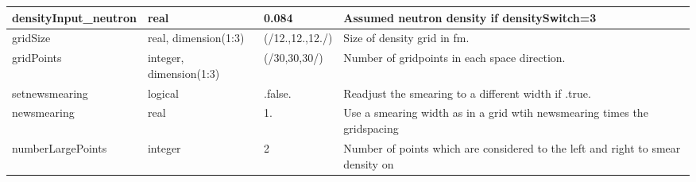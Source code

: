 \documentclass{article}
\begin{document}
\begin{longtable}{llll}
\midrule
densityInput\_neutron & \begin{minipage}[t]{2cm}real\end{minipage} & \begin{minipage}[t]{2cm}0.084\end{minipage} & \begin{minipage}[t]{12cm}Assumed neutron density if densitySwitch=3\end{minipage}\\*
\midrule
gridSize & \begin{minipage}[t]{2cm}real, dimension(1:3)\end{minipage} & \begin{minipage}[t]{2cm}(/12.,12.,12./)\end{minipage} & \begin{minipage}[t]{12cm}Size of density grid in fm.\end{minipage}\\*
\midrule
gridPoints & \begin{minipage}[t]{2cm}integer, dimension(1:3)\end{minipage} & \begin{minipage}[t]{2cm}(/30,30,30/)\end{minipage} & \begin{minipage}[t]{12cm}Number of gridpoints in each space direction.\end{minipage}\\*
\midrule
setnewsmearing & \begin{minipage}[t]{2cm}logical\end{minipage} & \begin{minipage}[t]{2cm}.false.\end{minipage} & \begin{minipage}[t]{12cm}Readjust the smearing to a different width if .true.\end{minipage}\\*
\midrule
newsmearing & \begin{minipage}[t]{2cm}real\end{minipage} & \begin{minipage}[t]{2cm}1.\end{minipage} & \begin{minipage}[t]{12cm}Use a smearing width as in a grid wtih newsmearing times the gridspacing\end{minipage}\\*
\midrule
numberLargePoints & \begin{minipage}[t]{2cm}integer\end{minipage} & \begin{minipage}[t]{2cm}2\end{minipage} & \begin{minipage}[t]{12cm}Number of points which are considered to the left and right to smear density on\end{minipage}\\*
\bottomrule
\end{longtable}
{ }
\end{document}
